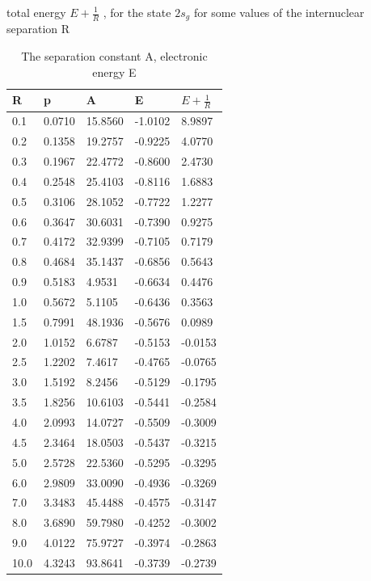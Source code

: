 \begin{table}[h!]
  \caption{ The separation constant A, electronic energy E}{ total energy $ E + \frac{1}{R} $ , for the state $ 2s_g $ for some values of the internuclear separation R } 
  \centering
  \label{2sg}
		\begin{tabular}{ m{6em} m{6em}  m{6em}  m{6em} m{6em} }
			\hline
			R & p & A & E & $ E + \frac{1}{R} $ \\ \hline \hline
      0.1 &0.0710 & 15.8560 & -1.0102 & 8.9897 \\
      0.2 & 0.1358 & 19.2757 & -0.9225 & 4.0770 \\
      0.3 & 0.1967 & 22.4772 & -0.8600 & 2.4730 \\
      0.4 & 0.2548 & 25.4103 & -0.8116 & 1.6883 \\
      0.5 & 0.3106 & 28.1052 & -0.7722 & 1.2277 \\
      0.6 & 0.3647 & 30.6031 & -0.7390 & 0.9275 \\
      0.7 & 0.4172 & 32.9399 & -0.7105 & 0.7179 \\
      0.8 & 0.4684 & 35.1437 & -0.6856 & 0.5643 \\
      0.9 & 0.5183 & 4.9531 & -0.6634 & 0.4476 \\
      1.0 & 0.5672 & 5.1105 & -0.6436 & 0.3563 \\
      1.5 & 0.7991 & 48.1936 & -0.5676 & 0.0989 \\
      2.0 & 1.0152 & 6.6787 & -0.5153 & -0.0153 \\
      2.5 & 1.2202 & 7.4617 & -0.4765 & -0.0765 \\
      3.0 & 1.5192 & 8.2456 & -0.5129 & -0.1795 \\
      3.5 & 1.8256 & 10.6103 & -0.5441 & -0.2584 \\
      4.0 & 2.0993 & 14.0727 & -0.5509 & -0.3009 \\
      4.5 & 2.3464 & 18.0503 & -0.5437 & -0.3215 \\
      5.0 & 2.5728 & 22.5360 & -0.5295 & -0.3295 \\
      6.0 & 2.9809 & 33.0090 & -0.4936 & -0.3269 \\
      7.0 & 3.3483 & 45.4488 & -0.4575 & -0.3147 \\
      8.0 & 3.6890 & 59.7980 & -0.4252 & -0.3002 \\
      9.0 & 4.0122 & 75.9727 & -0.3974 & -0.2863 \\
      10.0 & 4.3243 & 93.8641 & -0.3739 & -0.2739 \\
		\hline
		\end{tabular}
\end{table}


